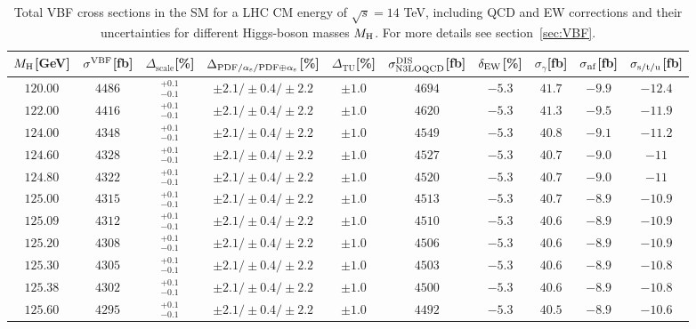 \begin{table}
\caption{Total VBF cross sections in the SM for a LHC CM energy of $\sqrt{s}=14$ TeV, including QCD and EW corrections
and their uncertainties for different Higgs-boson masses $M_\mathrm{H}$. For more details see section~\ref{sec:VBF}.}
\label{tab:vbf_XStot_14}
\begin{center}%
\begin{small}%
\begin{tabular}{cccccccc|cc}%
\toprule
$M_\mathrm{H}$[GeV] & $\sigma^{\mathrm{VBF}}$[fb] & $\Delta_{\mathrm{scale}}$[\%] & $\Delta_{\mathrm{PDF}/\alpha_{\mathrm{s}}/\mathrm{PDF\oplus\alpha_{\mathrm{s}}}}$[\%] & $\Delta_{\mathrm{TU}}$[\%] &
$\sigma_{\mathrm{N3LO} \mathrm{QCD}}^{\mathrm{DIS}}$[fb] & $\delta_{\mathrm{EW}}$[\%] & $\sigma_{\gamma}$[fb] & $\sigma_{\mbox{\scriptsize nf}}$[fb] & $\sigma_{\mbox{\scriptsize s/t/u}}$[fb]
\\
\midrule
$120.00$ & $4486$ & $^{+0.1}_{-0.1}$ & $\pm 2.1/\pm 0.4/\pm 2.2$ & $\pm 1.0$ & $4694$ & $-5.3$ & $41.7$ & $-9.9$ & $-12.4$ \\
$122.00$ & $4416$ & $^{+0.1}_{-0.1}$ & $\pm 2.1/\pm 0.4/\pm 2.2$ & $\pm 1.0$ & $4620$ & $-5.3$ & $41.3$ & $-9.5$ & $-11.9$ \\
$124.00$ & $4348$ & $^{+0.1}_{-0.1}$ & $\pm 2.1/\pm 0.4/\pm 2.2$ & $\pm 1.0$ & $4549$ & $-5.3$ & $40.8$ & $-9.1$ & $-11.2$ \\
$124.60$ & $4328$ & $^{+0.1}_{-0.1}$ & $\pm 2.1/\pm 0.4/\pm 2.2$ & $\pm 1.0$ & $4527$ & $-5.3$ & $40.7$ & $-9.0$ & $-11  $ \\
$124.80$ & $4322$ & $^{+0.1}_{-0.1}$ & $\pm 2.1/\pm 0.4/\pm 2.2$ & $\pm 1.0$ & $4520$ & $-5.3$ & $40.7$ & $-9.0$ & $-11  $ \\
$125.00$ & $4315$ & $^{+0.1}_{-0.1}$ & $\pm 2.1/\pm 0.4/\pm 2.2$ & $\pm 1.0$ & $4513$ & $-5.3$ & $40.7$ & $-8.9$ & $-10.9$ \\
$125.09$ & $4312$ & $^{+0.1}_{-0.1}$ & $\pm 2.1/\pm 0.4/\pm 2.2$ & $\pm 1.0$ & $4510$ & $-5.3$ & $40.6$ & $-8.9$ & $-10.9$ \\
$125.20$ & $4308$ & $^{+0.1}_{-0.1}$ & $\pm 2.1/\pm 0.4/\pm 2.2$ & $\pm 1.0$ & $4506$ & $-5.3$ & $40.6$ & $-8.9$ & $-10.9$ \\
$125.30$ & $4305$ & $^{+0.1}_{-0.1}$ & $\pm 2.1/\pm 0.4/\pm 2.2$ & $\pm 1.0$ & $4503$ & $-5.3$ & $40.6$ & $-8.9$ & $-10.8$ \\
$125.38$ & $4302$ & $^{+0.1}_{-0.1}$ & $\pm 2.1/\pm 0.4/\pm 2.2$ & $\pm 1.0$ & $4500$ & $-5.3$ & $40.6$ & $-8.9$ & $-10.8$ \\
$125.60$ & $4295$ & $^{+0.1}_{-0.1}$ & $\pm 2.1/\pm 0.4/\pm 2.2$ & $\pm 1.0$ & $4492$ & $-5.3$ & $40.5$ & $-8.9$ & $-10.6$ \\

\end{tabular}
\end{small}
\end{center}
\end{table}
